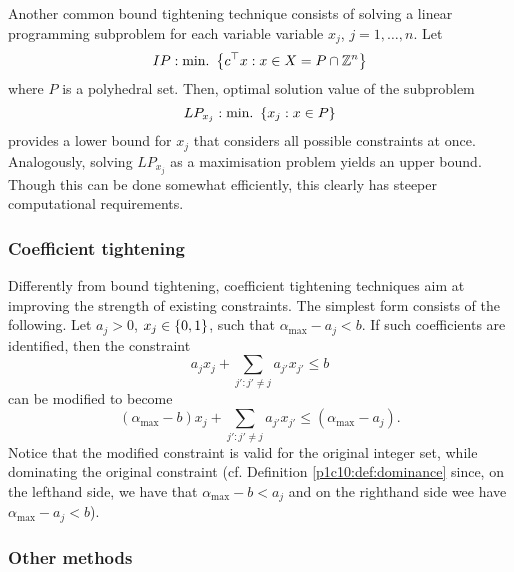 Another common bound tightening technique consists of solving a linear programming subproblem for each variable variable $x_j$, $j =1, \dots, n$. Let
%
\begin{equation*}
	IP : \mathop{\text{min.~}} \left\{ c^\top x : x \in X = P \cap \mathbb{Z}^n \right \}		
\end{equation*}
%
where $P$ is a polyhedral set. Then, optimal solution value of the subproblem
%
\begin{equation*}
	LP_{x_j} : \mathop{\text{min.~}} \left\{ x_j : x \in P \right \}		
\end{equation*}
%
provides a lower bound for $x_j$ that considers all possible constraints at once. Analogously, solving $LP_{x_j}$ as a maximisation problem yields an upper bound. Though this can be done somewhat efficiently, this clearly has steeper computational requirements. 

\subsubsection{Coefficient tightening}

Differently from bound tightening, coefficient tightening techniques aim at improving the strength of existing constraints. The simplest form consists of the following. Let $a_j > 0$, $x_j \in \left\{ 0,1 \right \}$, such that $\alpha_{\text{max}} - a_j < b$. If such coefficients are identified, then the constraint 
%
\begin{equation*}
	a_jx_j + \sum_{j' : j' \neq j} a_{j'}x_{j'}\leq b
\end{equation*}
%
can be modified to become
%
\begin{equation*}
	(\alpha_{\text{max}} - b)x_j + \sum_{j' : j' \neq j} a_{j'}x_{j'} \leq (\alpha_{\text{max}} - a_j).
\end{equation*}
%
Notice that the modified constraint is valid for the original integer set, while dominating the original constraint (cf. Definition \ref{p1c10:def:dominance} since, on the lefthand side, we have that $\alpha_{\text{max}} - b < a_j$ and on the righthand side wee have $\alpha_{\text{max}} - a_j < b$).


\subsubsection{Other methods}

